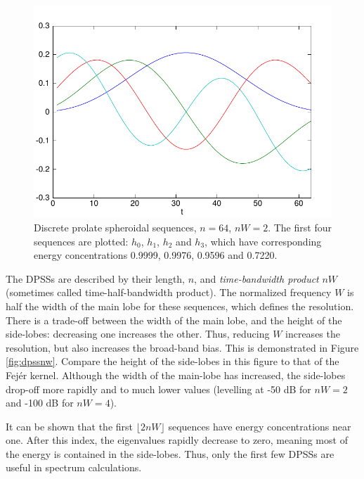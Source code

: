 \begin{figure}
    \centering
    \includegraphics[width=4.5in]{pics/dpss64.pdf}
    \caption[Discrete prolate spheroidal sequences]{Discrete prolate spheroidal sequences, $n=64$, $nW=2$.  The first four sequences are plotted: \textcolor{blue!80!black}{$h_0$}, \textcolor{green!40!black}{$h_1$}, \textcolor{red!80!black}{$h_2$} and \textcolor{green!60!blue!90!black!90}{$h_3$}, which have corresponding energy concentrations 0.9999, 0.9976, 0.9596 and 0.7220. \label{fig:dpss}}
\end{figure}

The DPSSs are described by their length, $n$, and \emph{time-bandwidth product} $nW$ (sometimes called time-half-bandwidth product). The normalized frequency $W$ is half the width of the main lobe for these sequences, which defines the resolution.  There is a trade-off between the width of the main lobe, and the height of the side-lobes: decreasing one increases the other.  Thus, reducing $W$ increases the resolution, but also increases the broad-band bias.  This is demonstrated in Figure \ref{fig:dpssnw}.  Compare the height of the side-lobes in this figure to that of the Fej\'er kernel.  Although the width of the main-lobe has increased, the side-lobes drop-off more rapidly and to much lower values (levelling at -50 dB for $nW=2$ and -100 dB for $nW=4$).  

It can be shown that the first $\lfloor2nW\rfloor$ sequences have energy concentrations near one.  After this index, the eigenvalues rapidly decrease to zero, meaning most of the energy is contained in the side-lobes.  Thus, only the first few DPSSs are useful in spectrum calculations.

